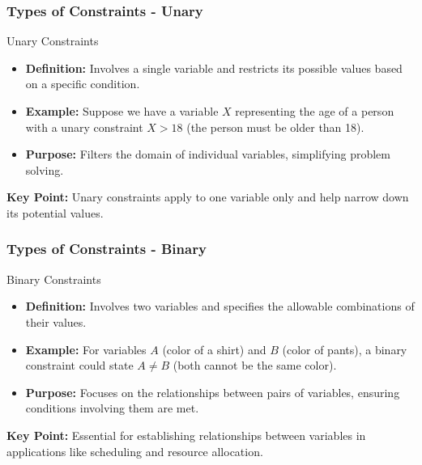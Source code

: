 \documentclass[aspectratio=169]{beamer}
\begin{document}
\begin{frame}[fragile]
    \frametitle{Types of Constraints - Unary}
    \begin{block}{Unary Constraints}
        \begin{itemize}
            \item \textbf{Definition:} Involves a single variable and restricts its possible values based on a specific condition.
            \item \textbf{Example:} Suppose we have a variable \( X \) representing the age of a person with a unary constraint \( X > 18 \) (the person must be older than 18).
            \item \textbf{Purpose:} Filters the domain of individual variables, simplifying problem solving.
        \end{itemize}
        \textbf{Key Point:} Unary constraints apply to one variable only and help narrow down its potential values.
    \end{block}
\end{frame}

\begin{frame}[fragile]
    \frametitle{Types of Constraints - Binary}
    \begin{block}{Binary Constraints}
        \begin{itemize}
            \item \textbf{Definition:} Involves two variables and specifies the allowable combinations of their values.
            \item \textbf{Example:} For variables \( A \) (color of a shirt) and \( B \) (color of pants), a binary constraint could state \( A \neq B \) (both cannot be the same color).
            \item \textbf{Purpose:} Focuses on the relationships between pairs of variables, ensuring conditions involving them are met.
        \end{itemize}
        \textbf{Key Point:} Essential for establishing relationships between variables in applications like scheduling and resource allocation.
    \end{block}
\end{frame}
\end{document}

